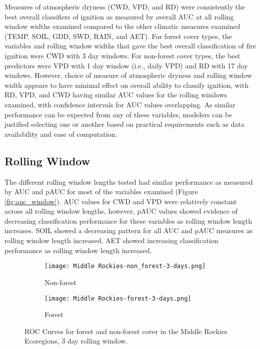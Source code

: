 \documentclass[11pt]{article}
\begin{document}
Measures of atmospheric dryness (CWD, VPD, and RD) were consistently the best overall classifiers of ignition as measured by overall AUC at all rolling window widths examined compared to the other climatic measures examined (TEMP, SOIL, GDD, SWD, RAIN, and AET).  For forest cover types, the variables and rolling window widths that gave the best overall classification of fire ignition were CWD with 3 day windows.  For non-forest cover types, the best predictors were VPD with 1 day window (i.e., daily VPD) and RD with 17 day windows.  However, choice of measure of atmospheric dryness and rolling window width appears to have minimal effect on overall ability to classify ignition, with RD, VPD, and CWD having similar AUC values for the rolling windows examined, with confidence intervals for AUC values overlapping.  As similar performance can be expected from any of these variables, modelers can be justified selecting one or another based on practical requirements such as data availability and ease of computation.

\subsection{Rolling Window}
The different rolling window lengths tested had similar performance as measured by AUC and pAUC for most of the variables examined (Figure \ref{fig:auc_window}). AUC values for CWD and VPD were relatively constant across all rolling window lengths, however, pAUC values showed evidence of decreasing classification performance for these variables as rolling window length increases.  SOIL showed a decreasing pattern for all AUC and pAUC measures as rolling window length increased.  AET showed increasing classification performance as rolling window length increased.  


\begin{figure}[ht]
  \centering
  \begin{subfigure}{.5\textwidth}
    \centering
    \texttt{[image: Middle Rockies-non\_forest-3-days.png]}
    \caption{Non-forest}
    \label{fig:mr-nf-auc}
  \end{subfigure}%
  \begin{subfigure}{.5\textwidth}
    \centering
    \texttt{[image: Middle Rockies-forest-3-days.png]}
    \caption{Forest}
    \label{fig:mr-f-auc}
  \end{subfigure}
  \caption{ROC Curves for forest and non-forest cover in the Middle Rockies Ecoregions, 3 day rolling window.}
  \label{fig:auc}
\end{figure}
\end{document}
